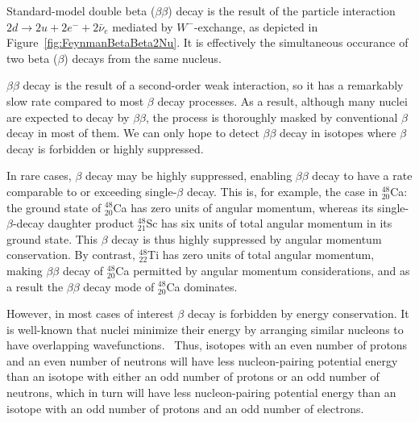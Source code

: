 Standard-model double beta ($\beta\beta$) decay is the result of the particle interaction $2d \rightarrow 2u + 2e^- + 2\bar{\nu}_e$ mediated by $W^-$-exchange, as depicted in Figure~\ref{fig:FeynmanBetaBeta2Nu}.  It is effectively the simultaneous occurance of two beta ($\beta$) decays from the same nucleus.

$\beta\beta$ decay is the result of a second-order weak interaction, so it has a remarkably slow rate compared to most $\beta$ decay processes.  As a result, although many nuclei are expected to decay by $\beta\beta$, the process is thoroughly masked by conventional $\beta$ decay in most of them.  We can only hope to detect $\beta\beta$ decay in isotopes where $\beta$ decay is forbidden or highly suppressed.

In rare cases, $\beta$ decay may be highly suppressed, enabling $\beta\beta$ decay to have a rate comparable to or exceeding single-$\beta$ decay.  This is, for example, the case in $^{48}_{20}$Ca: the ground state of $^{48}_{20}$Ca has zero units of angular momentum, whereas its single-$\beta$-decay daughter product $^{48}_{21}$Sc has six units of total angular momentum in its ground state.  This $\beta$ decay is thus highly suppressed by angular momentum conservation.  By contrast, $^{48}_{22}$Ti has zero units of total angular momentum, making $\beta\beta$ decay of $^{48}_{20}$Ca permitted by angular momentum considerations, and as a result the $\beta\beta$ decay mode of $^{48}_{20}$Ca dominates.~\cite{MyNuclearPhysicsBook}

However, in most cases of interest $\beta$ decay is forbidden by energy conservation.  It is well-known that nuclei minimize their energy by arranging similar nucleons to have overlapping wavefunctions.~\cite{MyNuclearPhysicsBook}  Thus, isotopes with an even number of protons and an even number of neutrons will have less nucleon-pairing potential energy than an isotope with either an odd number of protons or an odd number of neutrons, which in turn will have less nucleon-pairing potential energy than an isotope with an odd number of protons and an odd number of electrons.

